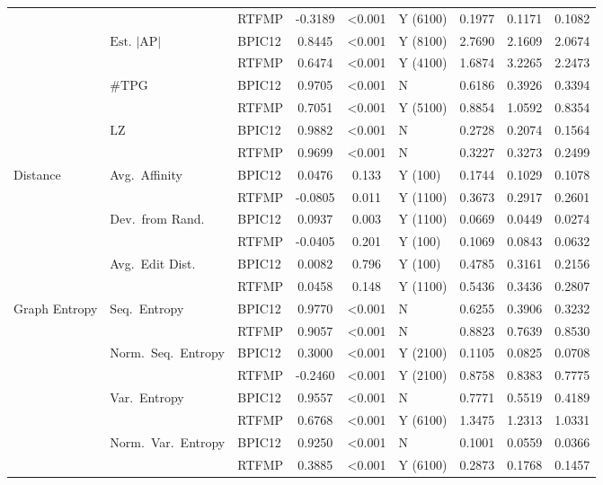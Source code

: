\begin{longtable}{lllcclccc}
 &  & RTFMP & -0.3189 & <0.001 & Y (6100) & 0.1977 & 0.1171 & 0.1082 \\
\cmidrule(lr){2-9}
 & $\text{Est.\ } |\text{AP}|$ & BPIC12 & 0.8445 & <0.001 & Y (8100) & 2.7690 & 2.1609 & 2.0674 \\
 &  & RTFMP & 0.6474 & <0.001 & Y (4100) & 1.6874 & 3.2265 & 2.2473 \\
\cmidrule(lr){2-9}
 & $\#\text{TPG}$ & BPIC12 & 0.9705 & <0.001 & N & 0.6186 & 0.3926 & 0.3394 \\
 &  & RTFMP & 0.7051 & <0.001 & Y (5100) & 0.8854 & 1.0592 & 0.8354 \\
\cmidrule(lr){2-9}
 & $\text{LZ}$ & BPIC12 & 0.9882 & <0.001 & N & 0.2728 & 0.2074 & 0.1564 \\
 &  & RTFMP & 0.9699 & <0.001 & N & 0.3227 & 0.3273 & 0.2499 \\
\cmidrule(lr){1-9}
Distance & Avg.\ Affinity & BPIC12 & 0.0476 & 0.133 & Y (100) & 0.1744 & 0.1029 & 0.1078 \\
 &  & RTFMP & -0.0805 & 0.011 & Y (1100) & 0.3673 & 0.2917 & 0.2601 \\
\cmidrule(lr){2-9}
 & Dev.\ from Rand. & BPIC12 & 0.0937 & 0.003 & Y (1100) & 0.0669 & 0.0449 & 0.0274 \\
 &  & RTFMP & -0.0405 & 0.201 & Y (100) & 0.1069 & 0.0843 & 0.0632 \\
\cmidrule(lr){2-9}
 & Avg.\ Edit Dist. & BPIC12 & 0.0082 & 0.796 & Y (100) & 0.4785 & 0.3161 & 0.2156 \\
 &  & RTFMP & 0.0458 & 0.148 & Y (1100) & 0.5436 & 0.3436 & 0.2807 \\
\cmidrule(lr){1-9}
Graph Entropy & Seq.\ Entropy & BPIC12 & 0.9770 & <0.001 & N & 0.6255 & 0.3906 & 0.3232 \\
 &  & RTFMP & 0.9057 & <0.001 & N & 0.8823 & 0.7639 & 0.8530 \\
\cmidrule(lr){2-9}
 & Norm.\ Seq.\ Entropy & BPIC12 & 0.3000 & <0.001 & Y (2100) & 0.1105 & 0.0825 & 0.0708 \\
 &  & RTFMP & -0.2460 & <0.001 & Y (2100) & 0.8758 & 0.8383 & 0.7775 \\
\cmidrule(lr){2-9}
 & Var.\ Entropy & BPIC12 & 0.9557 & <0.001 & N & 0.7771 & 0.5519 & 0.4189 \\
 &  & RTFMP & 0.6768 & <0.001 & Y (6100) & 1.3475 & 1.2313 & 1.0331 \\
\cmidrule(lr){2-9}
 & Norm.\ Var.\ Entropy & BPIC12 & 0.9250 & <0.001 & N & 0.1001 & 0.0559 & 0.0366 \\
 &  & RTFMP & 0.3885 & <0.001 & Y (6100) & 0.2873 & 0.1768 & 0.1457 \\

\bottomrule
\end{longtable}
